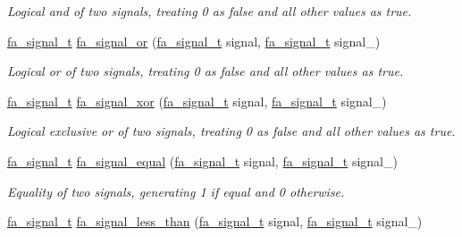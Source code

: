 \begin{DoxyCompactItemize}
\begin{DoxyCompactList}\small\item\em Logical {\itshape and} of two signals, treating 0 as false and all other values as true. \end{DoxyCompactList}\item 
\hyperlink{group___fa_signal_gac5c72f160cd6e93a6783551627b166e5}{fa\-\_\-signal\-\_\-t} \hyperlink{group___fa_signal_ga37bf5b36b5cbc714ed1766e08b832333}{fa\-\_\-signal\-\_\-or} (\hyperlink{group___fa_signal_gac5c72f160cd6e93a6783551627b166e5}{fa\-\_\-signal\-\_\-t} signal, \hyperlink{group___fa_signal_gac5c72f160cd6e93a6783551627b166e5}{fa\-\_\-signal\-\_\-t} signal\-\_\-)
\begin{DoxyCompactList}\small\item\em Logical {\itshape or} of two signals, treating 0 as false and all other values as true. \end{DoxyCompactList}\item 
\hyperlink{group___fa_signal_gac5c72f160cd6e93a6783551627b166e5}{fa\-\_\-signal\-\_\-t} \hyperlink{group___fa_signal_ga6a8bf1c027c56b7d92ae7e219040f622}{fa\-\_\-signal\-\_\-xor} (\hyperlink{group___fa_signal_gac5c72f160cd6e93a6783551627b166e5}{fa\-\_\-signal\-\_\-t} signal, \hyperlink{group___fa_signal_gac5c72f160cd6e93a6783551627b166e5}{fa\-\_\-signal\-\_\-t} signal\-\_\-)
\begin{DoxyCompactList}\small\item\em Logical {\itshape exclusive or} of two signals, treating 0 as false and all other values as true. \end{DoxyCompactList}\item 
\hyperlink{group___fa_signal_gac5c72f160cd6e93a6783551627b166e5}{fa\-\_\-signal\-\_\-t} \hyperlink{group___fa_signal_gafd90e34af8ae7f10ae5b125227c8f0c5}{fa\-\_\-signal\-\_\-equal} (\hyperlink{group___fa_signal_gac5c72f160cd6e93a6783551627b166e5}{fa\-\_\-signal\-\_\-t} signal, \hyperlink{group___fa_signal_gac5c72f160cd6e93a6783551627b166e5}{fa\-\_\-signal\-\_\-t} signal\-\_\-)
\begin{DoxyCompactList}\small\item\em Equality of two signals, generating 1 if equal and 0 otherwise. \end{DoxyCompactList}\item 
\hyperlink{group___fa_signal_gac5c72f160cd6e93a6783551627b166e5}{fa\-\_\-signal\-\_\-t} \hyperlink{group___fa_signal_ga7f2daa4cb78309105fdc50fdf522b84b}{fa\-\_\-signal\-\_\-less\-\_\-than} (\hyperlink{group___fa_signal_gac5c72f160cd6e93a6783551627b166e5}{fa\-\_\-signal\-\_\-t} signal, \hyperlink{group___fa_signal_gac5c72f160cd6e93a6783551627b166e5}{fa\-\_\-signal\-\_\-t} signal\-\_\-)

\end{DoxyCompactItemize}
